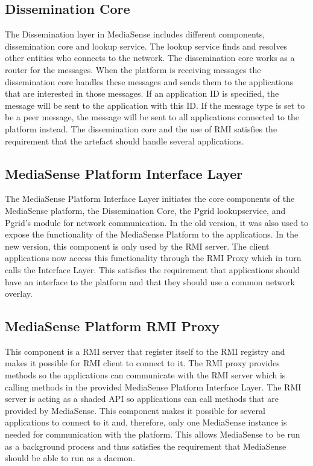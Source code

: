 \subsection{Dissemination Core}
The Dissemination layer in MediaSense includes different components, dissemination core and lookup service. The lookup service finds and resolves other entities who connects to the network. The dissemination core works as a router for the messages. When the platform is receiving messages the dissemination core handles these messages and sends them to the applications that are interested in those messages. If an application ID is specified, the message will be sent to the application with this ID. If the message type is set to be a peer message, the message will be sent to all applications connected to the platform instead. The dissemination core and the use of RMI satisfies the requirement that the artefact should handle several applications.

\subsection{MediaSense Platform Interface Layer}
The MediaSense Platform Interface Layer initiates the core components of the MediaSense platform, the Dissemination Core, the Pgrid lookupservice, and Pgrid's module for network communication. In the old version, it was also used to expose the functionality of the MediaSense Platform to the applications. In the new version, this component is only used by the RMI server. The client applications now access this functionality through the RMI Proxy which in turn calls the Interface Layer. This satisfies the requirement that applications should have an interface to the platform and that they should use a common network overlay.

\subsection{MediaSense Platform RMI Proxy}
This component is a RMI server that register itself to the RMI registry and makes it possible for RMI client to connect to it. The RMI proxy provides methods so the applications can communicate with the RMI server which is calling methods in the provided MediaSense Platform Interface Layer. The RMI server is acting as a shaded API so applications can call methods that are provided by MediaSense. This component makes it possible for several applications to connect to it and, therefore, only one MediaSense instance is needed for communication with the platform. This allows MediaSense to be run as a background process and thus satisfies the requirement that MediaSense should be able to run as a daemon.

